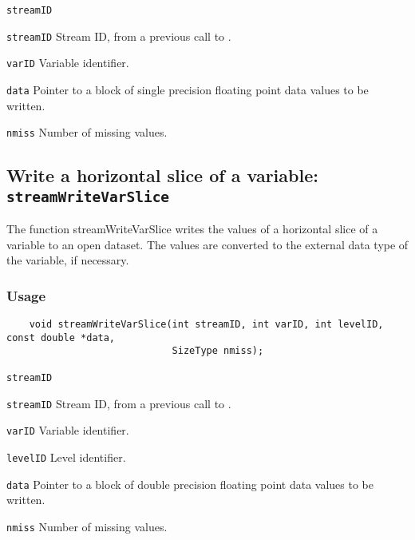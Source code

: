 \hspace*{4mm}\begin{minipage}[]{15cm}
\begin{deflist}{\texttt{streamID}\ }
\item[\texttt{streamID}]
Stream ID, from a previous call to {}.
\item[\texttt{varID}]
Variable identifier.
\item[\texttt{data}]
Pointer to a block of single precision floating point data values to be written.
\item[\texttt{nmiss}]
Number of missing values.

\end{deflist}
\end{minipage}


\subsection{Write a horizontal slice of a variable: \texttt{streamWriteVarSlice}}
\label{streamWriteVarSlice}

The function streamWriteVarSlice writes the values of a horizontal slice of a variable to an open dataset.
The values are converted to the external data type of the variable, if necessary.
\subsubsection*{Usage}

\begin{verbatim}
    void streamWriteVarSlice(int streamID, int varID, int levelID, const double *data, 
                             SizeType nmiss);
\end{verbatim}

\hspace*{4mm}\begin{minipage}[]{15cm}
\begin{deflist}{\texttt{streamID}\ }
\item[\texttt{streamID}]
Stream ID, from a previous call to {}.
\item[\texttt{varID}]
Variable identifier.
\item[\texttt{levelID}]
Level identifier.
\item[\texttt{data}]
Pointer to a block of double precision floating point data values to be written.
\item[\texttt{nmiss}]
Number of missing values.

\end{deflist}
\end{minipage}


